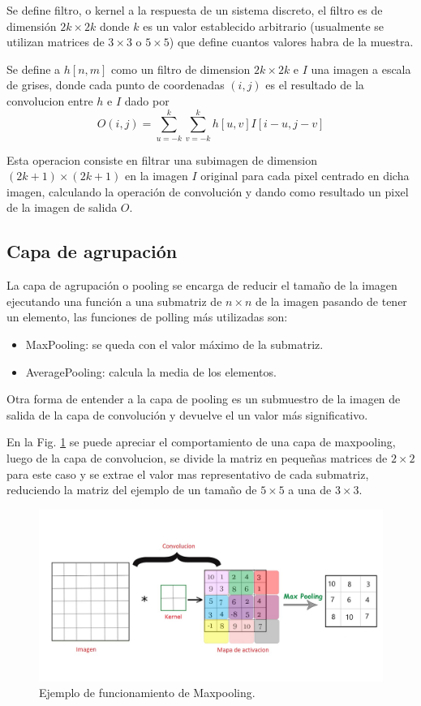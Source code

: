 Se define filtro, o kernel a la respuesta de un sistema discreto, el filtro es de dimensión $2k \times 2k$ donde $k$ es un
valor establecido arbitrario (usualmente se utilizan matrices de $3 \times 3$ o $5 \times 5$) que define cuantos valores habra de la muestra.

Se define a $h[n,m]$ como un filtro de dimension $2k \times 2k$ e $I$ una imagen a escala de grises, donde cada punto de coordenadas $(i,j)$ es el
resultado de la convolucion entre $h$ e $I$ dado por
\begin{equation}
    O(i,j)= \sum_{u=-k}^{k} \sum_{v=-k}^{k} h[u,v]I[i-u,j-v]
\end{equation}

Esta operacion consiste en filtrar una subimagen de dimension $(2k+1)\times(2k+1)$ en la imagen $I$ original para cada pixel centrado en dicha imagen, calculando la operación de convolución y dando como resultado un pixel de la imagen de salida $O$.

\subsection{Capa de agrupación}

La capa de agrupación o pooling se encarga de reducir el tamaño de la imagen ejecutando una función a una submatriz de $n \times n$ de la imagen pasando de tener un elemento, las funciones de polling más utilizadas son:

\begin{itemize}
    \item MaxPooling: se queda con el valor máximo de la submatriz.
    \item AveragePooling: calcula la media de los elementos.
\end{itemize}

Otra forma de entender a la capa de pooling es un submuestro de la imagen de salida de la capa de convolución y devuelve el un valor más significativo.

En la Fig. \ref{fig:ejemplo-mp} se puede apreciar el comportamiento de una capa de maxpooling, luego de la capa de convolucion, se divide la matriz
en pequeñas matrices de $2 \times 2$ para este caso y se extrae el valor mas representativo de cada submatriz, reduciendo la matriz del ejemplo de un tamaño de
$5 \times 5$ a una de $3 \times 3$.
\begin{figure}
    \centering
    \includegraphics[width=1\textwidth]{imgs/ej-maxpooling.jpg}
    \caption{Ejemplo de funcionamiento de Maxpooling.}
    \label{fig:ejemplo-mp}
\end{figure}

